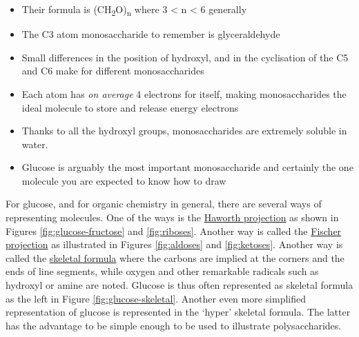 \documentclass[]{book}
\providecommand{\tightlist}{%
  \setlength{\itemsep}{0pt}\setlength{\parskip}{0pt}}
\theoremstyle{definition}
\theoremstyle{definition}
\theoremstyle{definition}
\theoremstyle{remark}
\begin{document}
\begin{itemize}
\tightlist
\item
  Their formula is (CH\textsubscript{2}O)\textsubscript{n} where 3
  \textless{} n \textless{} 6 generally
\item
  The C3 atom monosaccharide to remember is glyceraldehyde
\item
  Small differences in the position of hydroxyl, and in the cyclisation
  of the C5 and C6 make for different monosaccharides
\item
  Each atom has \emph{on average} 4 electrons for itself, making
  monosaccharides the ideal molecule to store and release energy
  electrons
\item
  Thanks to all the hydroxyl groups, monosaccharides are extremely
  soluble in water.
\item
  Glucose is arguably the most important monosaccharide and certainly
  the one molecule you are expected to know how to draw
\end{itemize}

For glucose, and for organic chemistry in general, there are several
ways of representing molecules. One of the ways is the
\protect\hyperlink{haworth}{Haworth projection} as shown in Figures
\ref{fig:glucose-fructose} and \ref{fig:riboses}. Another way is called
the \protect\hyperlink{Fischer}{Fischer projection} as illustrated in
Figures \ref{fig:aldoses} and \ref{fig:ketoses}. Another way is called
the \protect\hyperlink{skeletal-formula}{skeletal formula} where the
carbons are implied at the corners and the ends of line segments, while
oxygen and other remarkable radicals such as hydroxyl or amine are
noted. Glucose is thus often represented as skeletal formula as the left
in Figure \ref{fig:glucose-skeletal}. Another even more simplified
representation of glucose is represented in the `hyper' skeletal
formula. The latter has the advantage to be simple enough to be used to
illustrate polysaccharides.
\end{document}
